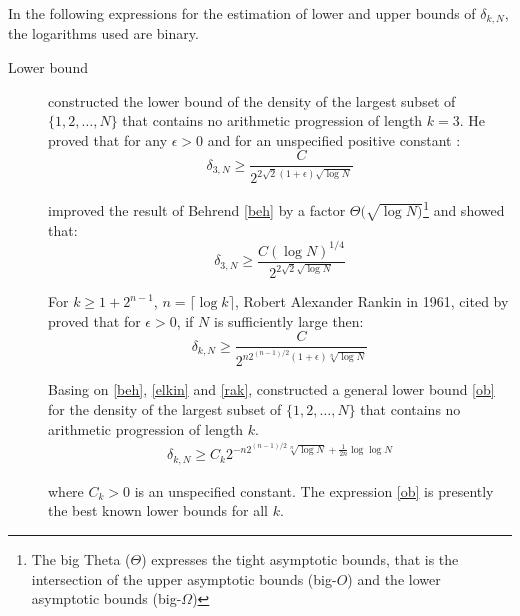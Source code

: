 In the following expressions for the estimation of lower and upper bounds of $\delta_{k,N}$, the logarithms used are binary.
\begin{description}
\item[Lower bound]
\cite{behrend1946sets} constructed the lower bound of the density of the largest subset of $\{1,2, \ldots, N\}$ that contains no arithmetic progression of length $k=3$. He proved that for any $\epsilon >0$ and for an unspecified positive constant :
\begin{equation}
\delta_{3,N} \geq \frac{C}{2^{2\sqrt{2}(1+\epsilon) \sqrt{\log N}}} \label{beh}
\end{equation}

\cite{elkin2010improved} improved the result of Behrend \eqref{beh} by a factor $\Theta (\sqrt{\log N)}$\footnote{The big Theta ($\Theta$) expresses the tight asymptotic  bounds, that is the intersection of  the upper asymptotic bounds (big-$O$) and the lower asymptotic bounds (big-$\Omega$) } and showed that:
\begin{equation}
\delta_{3,N} \geq \frac{C (\log N)^{1/4}}{2^{2\sqrt{2} \sqrt{\log N}}} \label{elkin}
\end{equation}

For $k \geq 1+2^{n-1}$,  $n=\lceil \log k \rceil$, Robert Alexander Rankin in 1961, cited by \cite{o2011sets} proved that for $\epsilon >0$,  if $N$ is sufficiently large then:
\begin{equation}
\delta_{k,N} \geq \frac{C}{2^{n2^{(n-1)/2}(1+\epsilon) \sqrt[n]{\log N}}} \label{rak}
\end{equation}


Basing on \eqref{beh}, \eqref{elkin} and \eqref{rak}, \cite{o2011sets} constructed  a general lower bound \eqref{ob} for the density of the largest subset of $\{1,2, \ldots, N\}$ that contains no arithmetic progression of length $k.$
\begin{align}
\delta_{k,N} \geq C_k 2^{-n2^{(n-1)/2} \sqrt[n]{\log N} +\frac{1}{2n} \log \log N } \label{ob}
\end{align}

where $C_k >0$ is an unspecified constant. The expression \eqref{ob} is presently the best known  lower bounds for all $k.$


\end{description}
